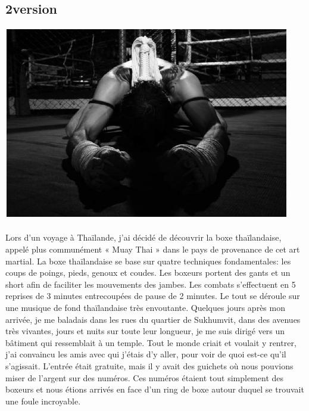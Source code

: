 \subsection{2\ieme version}

\begin{center}
	\includegraphics[scale=0.7]{Thai1.jpg}
\end{center}

\paragraph{} Lors d'un voyage à Thaïlande, j'ai décidé de découvrir la boxe
thaïlandaise, appelé plus communément « Muay Thai » dans le pays de provenance
de cet art martial. La boxe thaïlandaise se base sur quatre techniques
fondamentales: les coups de poings, pieds, genoux et coudes. Les boxeurs
portent des gants et un short afin de faciliter les mouvements des jambes. Les
combats s'effectuent en 5 reprises de 3 minutes entrecoupées de pause de 2
minutes. Le tout se déroule sur une musique de fond thaïlandaise très
envoutante.  Quelques jours après mon arrivée, je me baladais dans les rues du
quartier de Sukhumvit, dans des avenues très vivantes, jours et nuits sur toute
leur longueur, je me suis dirigé vers un bâtiment qui ressemblait à un temple.
Tout le monde criait et voulait y rentrer, j'ai convaincu les amis avec qui
j'étais d'y aller, pour voir de quoi est-ce qu'il s'agissait.  L'entrée était
gratuite, mais il y avait des guichets où nous pouvions miser de l'argent sur
des numéros. Ces numéros étaient tout simplement des boxeurs et nous étions
arrivés en face d'un ring de boxe autour duquel se trouvait une foule
incroyable.

